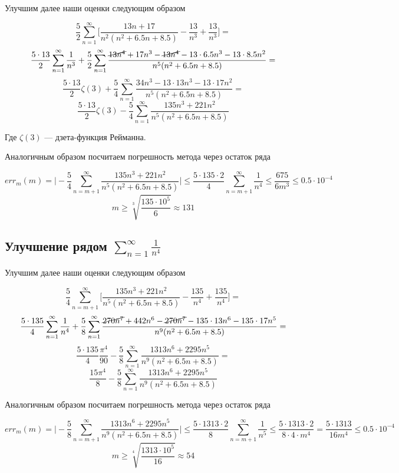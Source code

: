 \documentclass[11pt,a4paper,oneside]{article}
\begin{document}
Улучшим далее наши оценки следующим образом

$$ \frac{5}{2} \sum_{n = 1}^{\infty} \biggr[ \frac{13n + 17}{n^2 (n^2 + 6.5n + 8.5)} - 
	\frac{13}{n^3} + \frac{13}{n^3} \biggr] =$$
$$ \frac{5 \cdot 13}{2} \sum_{n = 1}^{\infty} \frac{1}{n^3} +
	\frac{5}{2} \sum_{n = 1}^{\infty}
	\frac{\cancel{13 n^4} + 17n^3 - \cancel{13 n^4} -
	13 \cdot 6.5 n^3 - 13 \cdot 8.5 n^2}{n^5 (n^2 + 6.5n + 8.5)} = $$
$$ \frac{5 \cdot 13}{2} \zeta(3) +
	\frac{5}{4} \sum_{n = 1}^{\infty}
	\frac{34 n^3 -
	13 \cdot 13 n^3 - 13 \cdot 17 n^2}{n^5 (n^2 + 6.5n + 8.5)} = $$
$$ \frac{5 \cdot 13}{2} \zeta(3) -
	\frac{5}{4} \sum_{n = 1}^{\infty}
	\frac{135 n^3 + 221 n^2}{n^5 (n^2 + 6.5n + 8.5)}$$
	
Где $\zeta(3)$ --- дзета-функция Рейманна.
	
Аналогичным образом посчитаем погрешность метода через остаток ряда

$$ err_{m}(m) = \biggr| - \frac{5}{4} \sum_{n = m + 1}^{\infty}
	\frac{135 n^3 + 221 n^2}{n^5 (n^2 + 6.5n + 8.5)} \biggr| \le
	\frac{5 \cdot 135 \cdot 2}{4} \sum_{n = m + 1}^{\infty} \frac{1}{n^4} \le
	\frac{675}{6 m^3} \le 0.5 \cdot 10^{-4} $$
$$ m \ge \sqrt[3]{\frac{135 \cdot 10^5}{6}} \approx 131 $$
		
\subsection{Улучшение рядом $ \sum_{n = 1}^{\infty} \frac{1}{n^4} $}
		
Улучшим далее наши оценки следующим образом

$$ \frac{5}{4} \sum_{n = m + 1}^{\infty}
	\biggr[ \frac{135 n^3 + 221 n^2}{n^5 (n^2 + 6.5n + 8.5)} - 
	\frac{135}{n^4} + \frac{135}{n^4} \biggr] =$$
$$ \frac{5 \cdot 135}{4} \sum_{n = 1}^{\infty} \frac{1}{n^4} +
	\frac{5}{8} \sum_{n = 1}^{\infty}
	\frac{\cancel{270 n^7} + 442 n^6 - \cancel{270 n^7} -
		135 \cdot 13 n^6 - 135 \cdot 17 n^5}{n^9 (n^2 + 6.5n + 8.5)} = $$
$$ \frac{5 \cdot 135}{4} \frac{\pi^4}{90} -
	\frac{5}{8} \sum_{n = 1}^{\infty}
	\frac{1313 n^6 + 2295 n^5}{n^9 (n^2 + 6.5n + 8.5)} = $$
$$ \frac{15 \pi^4}{8} -
	\frac{5}{8} \sum_{n = 1}^{\infty}
	\frac{1313 n^6 + 2295 n^5}{n^9 (n^2 + 6.5n + 8.5)} $$

Аналогичным образом посчитаем погрешность метода через остаток ряда

$$ err_{m}(m) =
	\biggr| - \frac{5}{8} \sum_{n = m + 1}^{\infty}
		\frac{1313 n^6 + 2295 n^5}{n^9 (n^2 + 6.5n + 8.5)} \biggr| \le
	\frac{5 \cdot 1313 \cdot 2}{8} \sum_{n = m + 1}^{\infty} \frac{1}{n^5} \le
	\frac{5 \cdot 1313 \cdot 2}{8 \cdot 4 \cdot m^4} = 
	\frac{5 \cdot 1313}{16 m^4} \le 0.5 \cdot 10^{-4} $$
$$ m \ge \sqrt[4]{ \frac{1313 \cdot 10^{5}}{16} } \approx 54 $$
\end{document}
